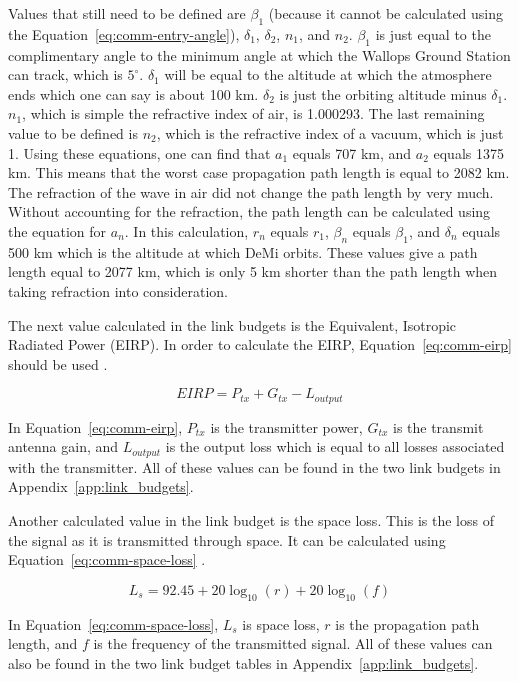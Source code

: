 \documentclass[12pt]{article}
\begin{document}
Values that still need to be defined are $\beta_1$ (because it cannot be calculated using the Equation~\ref{eq:comm-entry-angle}), $\delta_1$, $\delta_2$, $n_1$, and $n_2$. $\beta_1$ is just equal to the complimentary angle to the minimum angle at which the Wallops Ground Station can track, which is $5^\circ$. $\delta_1$ will be equal to the altitude at which the atmosphere ends which one can say is about 100 km. $\delta_2$ is just the orbiting altitude minus $\delta_1$. $n_1$, which is simple the refractive index of air, is 1.000293. The last remaining value to be defined is $n_2$, which is the refractive index of a vacuum, which is just 1. Using these equations, one can find that $a_1$ equals 707 km, and $a_2$ equals 1375 km. This means that the worst case propagation path length is equal to 2082 km. The refraction of the wave in air did not change the path length by very much. Without accounting for the refraction, the path length can be calculated using the equation for $a_n$. In this calculation, $r_n$ equals $r_1$, $\beta_n$ equals $\beta_1$, and $\delta_n$ equals 500 km which is the altitude at which DeMi orbits. These values give a path length equal to 2077 km, which is only 5 km shorter than the path length when taking refraction into consideration.

The next value calculated in the link budgets is the Equivalent, Isotropic Radiated Power (EIRP). In order to calculate the EIRP, Equation~\ref{eq:comm-eirp} should be used \cite[p.~476]{SMAD}.

\begin{equation}\label{eq:comm-eirp}
EIRP = P_{tx} + G_{tx} - L_{output} 
\end{equation}

In Equation~\ref{eq:comm-eirp}, $P_{tx}$ is the transmitter power, $G_{tx}$ is the transmit antenna gain, and $L_{output}$ is the output loss which is equal to all losses associated with the transmitter. All of these values can be found in the two link budgets in Appendix~\ref{app:link_budgets}.

Another calculated value in the link budget is the space loss. This is the loss of the signal as it is transmitted through space. It can be calculated using Equation~\ref{eq:comm-space-loss} \cite[p.~476]{SMAD}.

\begin{equation}\label{eq:comm-space-loss}
L_s = 92.45 + 20\log_{10}(r) + 20\log_{10}(f) 
\end{equation}

In Equation~\ref{eq:comm-space-loss}, $L_s$ is space loss, $r$ is the propagation path length, and $f$ is the frequency of the transmitted signal. All of these values can also be found in the two link budget tables in Appendix~\ref{app:link_budgets}.
\end{document}
